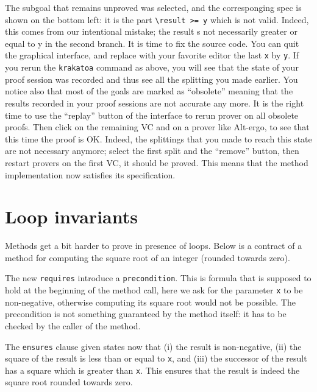 \documentclass[a4paper,11pt,twoside,openright]{report}
\begin{document}
The subgoal that remains unproved was selected, and the corresponging
spec is shown on the bottom left: it is the part \verb|\result >= y|
which is not valid. Indeed, this comes from our intentional mistake;
the result s not necessarily greater or equal to y in the second
branch.  It is time to fix the source code. You can quit the graphical
interface, and replace with your favorite editor the last \texttt{x}
by \texttt{y}.  If you rerun the \texttt{krakatoa} command as above,
you will see that the state of your proof session was recorded and
thus see all the splitting you made earlier. You notice also that most
of the goals are marked as ``obsolete'' meaning that the results
recorded in your proof sessions are not accurate any more. It is the
right time to use the ``replay'' button of the interface to rerun
prover on all obsolete proofs. Then click on the remaining VC and on a
prover like Alt-ergo, to see that this time the proof is OK. Indeed,
the splittings that you made to reach this state are not necessary
anymore; select the first split and the ``remove'' button, then
restart provers on the first VC, it should be proved. This means that
the method implementation now satisfies its specification.

\clearpage

\section{Loop invariants}

Methods get a bit harder to prove in presence of loops. Below is a
contract of a method for computing the square root of an
integer (rounded towards zero).

The new \texttt{requires} introduce a \texttt{precondition}. This is
formula that is supposed to hold at the beginning of the method call,
here we ask for the parameter \texttt{x} to be non-negative, otherwise
computing its square root would not be possible. The precondition is
not something guaranteed by the method itself: it has to be checked by
the caller of the method.

The \texttt{ensures} clause given states now that (i) the result is
non-negative, (ii) the square of the result is less than or equal to
\texttt{x}, and (iii) the successor of the result has a square which
is greater than \texttt{x}. This ensures that the result is indeed the
square root rounded towards zero.
\end{document}
